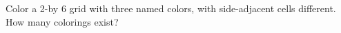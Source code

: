 Color a 2-by 6 grid with three named colors, with side-adjacent cells different. How many colorings exist?
